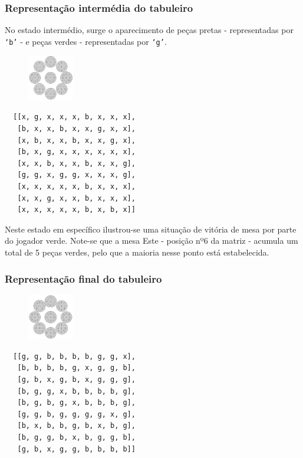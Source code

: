 \documentclass[a4paper]{article}
\begin{document}
\subsubsection{Representação intermédia do tabuleiro}
No estado intermédio, surge o aparecimento de peças pretas - representadas por \texttt{`b'} - e peças verdes - representadas por \texttt{`g'}.

\begin{figure}
\centering
\includegraphics[width=0.18\textwidth]{board-setup-2.png}
\end{figure}

\begin{lstlisting}
  [[x, g, x, x, x, b, x, x, x],
   [b, x, x, b, x, x, g, x, x],
   [x, b, x, x, b, x, x, g, x],
   [b, x, g, x, x, x, x, x, x],
   [x, x, b, x, x, b, x, x, g],
   [g, g, x, g, g, x, x, x, g],
   [x, x, x, x, x, b, x, x, x],
   [x, x, g, x, x, b, x, x, x],
   [x, x, x, x, x, b, x, b, x]]
\end{lstlisting}

Neste estado em específico ilustrou-se uma situação de vitória de mesa por parte do jogador verde. Note-se que a mesa Este - posição nº6 da matriz - acumula um total de 5 peças verdes, pelo que a maioria nesse ponto está estabelecida.

\subsubsection{Representação final do tabuleiro}

\begin{figure}
\centering
\includegraphics[width=0.18\textwidth]{board-setup-3.png}
\end{figure}


\begin{lstlisting}
  [[g, g, b, b, b, b, g, g, x],
   [b, b, b, b, g, x, g, g, b],
   [g, b, x, g, b, x, g, g, g],
   [b, g, g, x, b, b, b, b, g],
   [b, g, b, g, x, b, b, b, g],
   [g, g, b, g, g, g, g, x, g],
   [b, x, b, b, g, b, x, b, g],
   [b, g, g, b, x, b, g, g, b],
   [g, b, x, g, g, b, b, b, b]]
\end{lstlisting}
\end{document}
